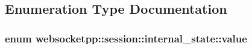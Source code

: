 \subsection{Enumeration Type Documentation}
\hypertarget{namespacewebsocketpp_1_1session_1_1internal__state_a981c3a4fb8962bad264d7efea05c508d}{}
\subsubsection[{value}]{\setlength{\rightskip}{0pt plus 5cm}enum {\bf websocketpp\+::session\+::internal\+\_\+state\+::value}}\label{namespacewebsocketpp_1_1session_1_1internal__state_a981c3a4fb8962bad264d7efea05c508d}
